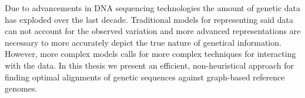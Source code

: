 \documentclass[thesis.tex]{subfiles}
\begin{document}
Due to advancements in DNA sequencing technologies the amount of genetic data has exploded over the last decade. Traditional models for representing said data can not account for the observed variation and more advanced representations are necessary to more accurately depict the true nature of genetical information. However, more complex models calls for more complex techniques for interacting with the data. In this thesis we present an efficient, non-heuristical approach for finding optimal alignments of genetic sequences against graph-based reference genomes.
\end{document}
